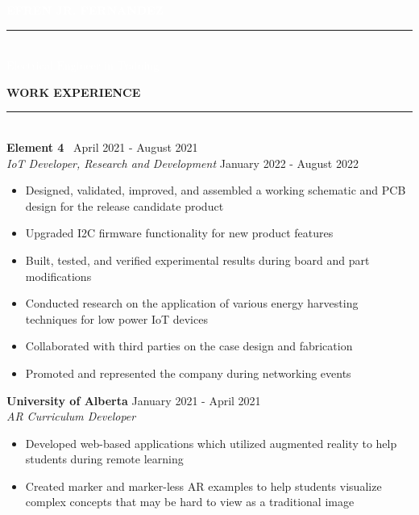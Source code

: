 \documentclass[10pt,letterpaper]{article}
\newcommand{\header}[2] {
    \vspace{10pt}
        {\LARGE\faIcon{#1}}\hspace{0.5em}\textbf{\LARGE{\uppercase{#2} } }
        \vspace{-5pt} \\
        \rule{0.1 \textwidth}{1pt}\hfill \\
}
\newcommand{\ExperienceHeader}[3] {
    \textbf{\large{#1} }
    \hfill
    {#3}\\
    \textit{#2}\\
    \vspace{-1em}
}
\begin{document}
\begin{paracol}{2}
\begin{rightcolumn}
\begin{center}
\begin{tcolorbox}[colback=red!54!green!71!blue!79,%
            colframe=black,
            width= 0.95\columnwidth,
           ]
\begin{center}
                \huge{ \textbf{ \textcolor{white}{\uppercase{Efren Jr. Fernandez} } } } \\
                \vspace{-0.8em}
                \textcolor{white}{ \rule{0.45\textwidth}{1pt} }\\
                \large{ \textcolor{white}{Electrical Engineer in Training} }
           \end{center}
        \end{tcolorbox}  
    \end{center} 
    \header{briefcase}{Work Experience}
    \textbf{\large{Element 4} }
    \hfill\
    {April 2021 - August 2021}\\
    \textit{IoT Developer, Research and Development}
    \hfill
    {January 2022 - August 2022}\\
    \vspace{-1em}
    \begin{itemize}
        \item Designed, validated, improved, and assembled a working schematic and PCB design for the release candidate product
        \item Upgraded I2C firmware functionality for new product features
        \item Built, tested, and verified experimental results during board and part \\modifications
        \item Conducted research on the application of various energy harvesting \\techniques for low power IoT devices
        \item Collaborated with third parties on the case design and fabrication
        \item Promoted and represented the company during networking events
    \end{itemize}
    \vspace{5pt}
    \ExperienceHeader{University of Alberta}{AR Curriculum Developer}{January 2021 - April 2021}
    \begin{itemize}
        \item Developed web-based applications which utilized augmented reality to help students during remote learning
        \item Created marker and marker-less AR examples to help students visualize complex concepts that may be hard to view as a traditional image

\end{itemize}
\end{rightcolumn}
\end{paracol}
\end{document}
